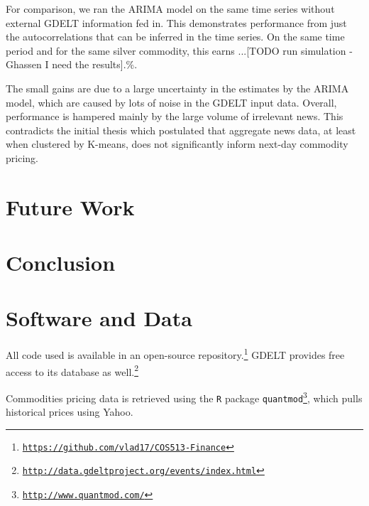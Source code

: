 \documentclass{article}
\begin{document}
For comparison, we ran the ARIMA model on the same time series without external GDELT information fed in. This demonstrates performance from just the autocorrelations that can be inferred in the time series. On the same time period and for the same silver commodity, this earns ...[TODO run simulation - Ghassen I need the results].\%.

The small gains are due to a large uncertainty in the estimates by the ARIMA model, which are caused by lots of noise in the GDELT input data. Overall, performance is hampered mainly by the large volume of irrelevant news. This contradicts the initial thesis which postulated that aggregate news data, at least when clustered by K-means, does not significantly inform next-day commodity pricing.

\section{Future Work}



\section{Conclusion}

\section{Software and Data}

All code used is available in an open-source repository.\footnote{\hyperref[https://github.com/vlad17/COS513-Finance]{\texttt{https://github.com/vlad17/COS513-Finance}}} GDELT provides free access to its database as well.\footnote{ \hyperref[http://data.gdeltproject.org/events/index.html]{\texttt{http://data.gdeltproject.org/events/index.html}}}

Commodities pricing data is retrieved using the \texttt{R} package \texttt{quantmod}\footnote{\hyperref[http://www.quantmod.com/]{\texttt{http://www.quantmod.com/}}}, which pulls historical prices using Yahoo.





\end{document}
